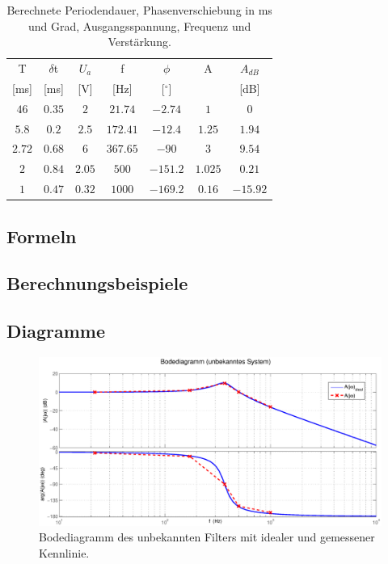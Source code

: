 \documentclass[12pt,a4paper,ngerman]{article}
\begin{document}
\begin{table}[H]
\begin{center}
\begin{tabular}{ |c|c|c|c|c|c|c| }
  \hline
    T & $\delta$t & $U_a$ & f & $\phi$ & A & $A_{dB}$\\

    [ms] & [ms] & [V] & [Hz] & [$^\circ$] & & [dB]\\
  \hline
$46$ & $0.35$ & $2$ & $21.74$ & $-2.74$ & $1$ & $0$\\
  \hline
$5.8$ & $0.2$ & $2.5$ & $172.41$ & $-12.4$ & $1.25$ & $1.94$\\
  \hline
$2.72$ & $0.68$ & $6$ & $367.65$ & $-90$ & $3$ & $9.54$\\
  \hline
$2$ & $0.84$ & $2.05$ & $500$ & $-151.2$ & $1.025$ & $0.21$\\
  \hline
$1$ & $0.47$ & $0.32$ & $1000$ & $-169.2$ & $0.16$ & $-15.92$\\
  \hline
\end{tabular}
\caption{Berechnete Periodendauer, Phasenverschiebung in ms und Grad, Ausgangsspannung, Frequenz und Verstärkung.}
\end{center}
\label{tab:1_ber}
\end{table}

\subsection{Formeln}

\subsection{Berechnungsbeispiele}

\subsection{Diagramme}
\begin{figure}[H]
\centering
\includegraphics[width=1.2\textwidth]{figures/bode_unbekannt.eps} 
\caption{Bodediagramm des unbekannten Filters mit idealer und gemessener Kennlinie.}
\label{fig:bode_unb}
\end{figure}
\end{document}
